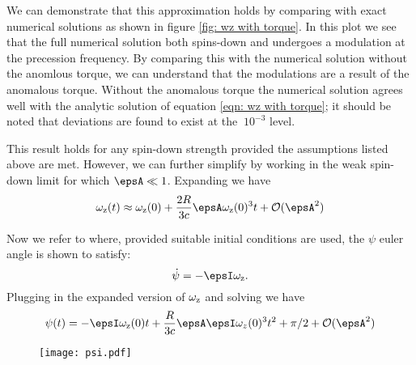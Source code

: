 \documentclass[/home/greg/Thesis/main/main.tex]{subfiles}
\begin{document}
We can demonstrate that this approximation holds by comparing with exact
numerical solutions as shown in figure \ref{fig: wz with torque}. In this plot
we see that the full numerical solution both spins-down and undergoes a
modulation at the precession frequency. By comparing this with the numerical
solution without the anomlous torque, we can understand that the modulations
are a result of the anomalous torque. Without the anomalous torque the numerical
solution agrees well with the analytic solution of equation 
\eqref{eqn: wz with torque}; it should be noted that deviations are found
to exist at the $~10^{-3}$ level.


This result holds for any spin-down strength provided the assumptions listed
above are met. However, we can further simplify by working in the weak 
spin-down limit for which $\epsA \ll 1$. Expanding we have
\begin{equation}
\wz(t) \approx \wz(0) + \frac{2R}{3c}\epsA \wz(0)^{3} t + \mathcal{O}(\epsA^{2})
\end{equation}

Now we refer to \citet{Landau1969} where, provided suitable initial conditions
are used, the $\psi$ euler angle is shown to satisfy:
\begin{equation}
\dot{\psi} = -\epsI \wz.
\end{equation}
Plugging in the expanded version of $\omega_{\mathrm{z}}$ and solving we have
\begin{equation}
\psi(t) = -\epsI\wz(0) t + \frac{R}{3c} \epsA \epsI \omega_{z}(0)^{3} t^{2} + \pi/2 + \mathcal{O}(\epsA^{2})
\end{equation}
\begin{figure}[htb]
\centering
\texttt{[image: psi.pdf]}
\caption{}
\label{}
\end{figure}
\end{document}

